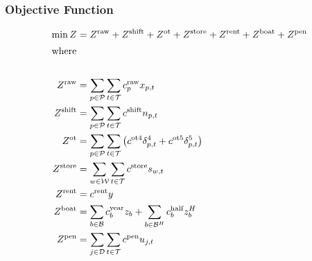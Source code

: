 \documentclass[10pt]{article}
\begin{document}
\subsubsection{Objective Function}
\begin{align}
    \min Z &= Z^{\text{raw}} + Z^{\text{shift}} + Z^{\text{ot}} + Z^{\text{store}} + Z^{\text{rent}} + Z^{\text{boat}} + Z^{\text{pen}}\\
    \shortintertext{where}\notag\\
    Z^{\text{raw}} &= \sum_{p\in \mathcal{P}}\sum_{t\in \mathcal{T}}c_p^{\text{raw}}x_{p, t}\\
    Z^{\text{shift}} &= \sum_{p\in \mathcal{P}}\sum_{t\in \mathcal{T}}c^{\text{shift}}n_{p, t}\\
    Z^{\text{ot}} &= \sum_{p\in \mathcal{P}}\sum_{t\in \mathcal{T}}\left(c^{\text{ot4}}\delta_{p, t}^4 + c^{\text{ot5}}\delta_{p, t}^5\right)\\
    Z^{\text{store}} &= \sum_{w\in \mathcal{W}}\sum_{t\in \mathcal{T}}c^{\text{store}}s_{w, t}\\
    Z^{\text{rent}}&= c^{\text{rent}}y\\
    Z^{\text{boat}} &= \sum_{b\in \mathcal{B}} c_b^{\text{year}}z_b + \sum_{b\in \mathcal{B}^H}c_b^{\text{half}}z_b^H\\
    Z^{\text{pen}} &= \sum_{j\in \mathcal{D}}\sum_{t\in \mathcal{T}}c^{\text{pen}}u_{j, t}
\end{align}
\newpage 
\end{document}
